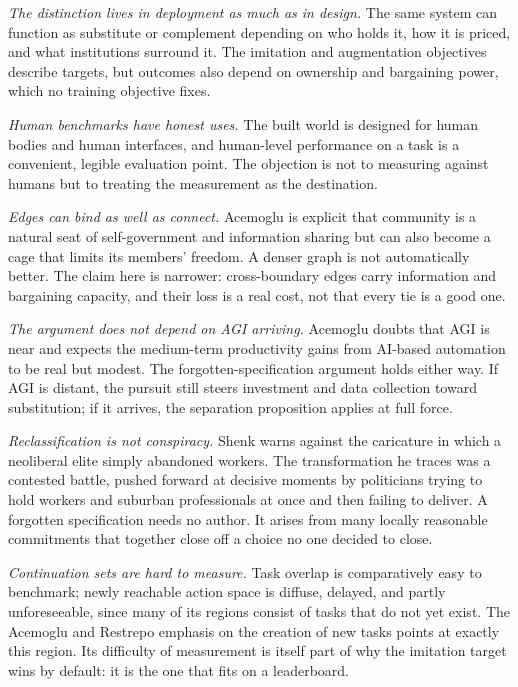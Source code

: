 \documentclass[11pt]{article}
\begin{document}
\emph{The distinction lives in deployment as much as in design.} The same system can function as substitute or complement depending on who holds it, how it is priced, and what institutions surround it. The imitation and augmentation objectives describe targets, but outcomes also depend on ownership and bargaining power, which no training objective fixes.

\emph{Human benchmarks have honest uses.} The built world is designed for human bodies and human interfaces, and human-level performance on a task is a convenient, legible evaluation point. The objection is not to measuring against humans but to treating the measurement as the destination.

\emph{Edges can bind as well as connect.} Acemoglu is explicit that community is a natural seat of self-government and information sharing but can also become a cage that limits its members' freedom. A denser graph is not automatically better. The claim here is narrower: cross-boundary edges carry information and bargaining capacity, and their loss is a real cost, not that every tie is a good one.

\emph{The argument does not depend on AGI arriving.} Acemoglu doubts that AGI is near and expects the medium-term productivity gains from AI-based automation to be real but modest. The forgotten-specification argument holds either way. If AGI is distant, the pursuit still steers investment and data collection toward substitution; if it arrives, the separation proposition applies at full force.

\emph{Reclassification is not conspiracy.} Shenk warns against the caricature in which a neoliberal elite simply abandoned workers. The transformation he traces was a contested battle, pushed forward at decisive moments by politicians trying to hold workers and suburban professionals at once and then failing to deliver. A forgotten specification needs no author. It arises from many locally reasonable commitments that together close off a choice no one decided to close.

\emph{Continuation sets are hard to measure.} Task overlap is comparatively easy to benchmark; newly reachable action space is diffuse, delayed, and partly unforeseeable, since many of its regions consist of tasks that do not yet exist. The Acemoglu and Restrepo emphasis on the creation of new tasks points at exactly this region. Its difficulty of measurement is itself part of why the imitation target wins by default: it is the one that fits on a leaderboard.
\end{document}
